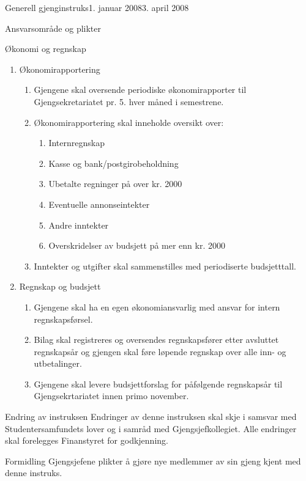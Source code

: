 \begin{instruks}{Generell gjenginstruks}{1. januar 2008}{3. april 2008}
\begin{instruksledd}{Ansvarsområde og plikter}
    \end{instruksledd}

	\begin{instruksledd}{Økonomi og regnskap}
		\begin{enumerate}
			\item Økonomirapportering
			\begin{enumerate}  
				\item Gjengene skal oversende periodiske økonomirapporter til
				Gjengsekretariatet pr. 5. hver måned i semestrene.
				\item Økonomirapportering skal inneholde oversikt over:
				\begin {enumerate} 
					\item Internregnskap
					\item Kasse og bank/postgirobeholdning
					\item Ubetalte regninger på over kr. 2000
					\item Eventuelle annonseintekter
					\item Andre inntekter
					\item Overskridelser av budsjett på mer enn kr. 2000
				\end {enumerate}
				\item Inntekter og utgifter skal sammenstilles med periodiserte 
				budsjetttall.
			\end {enumerate}
			\item {Regnskap og budsjett}
			\begin {enumerate}
				\item Gjengene skal ha en egen økonomiansvarlig med ansvar for intern 
				regnskapsførsel.
				\item Bilag skal registreres og oversendes regnskapsfører etter avsluttet 
				regnskapsår og gjengen skal føre løpende regnskap over alle inn- og 
				utbetalinger.
				\item Gjengene skal levere budsjettforslag for påfølgende regnskapsår til 
				Gjengsekrtariatet innen primo november.
			\end {enumerate}
		\end{enumerate}

	\end{instruksledd}

	\begin{instruksledd}{Endring av instruksen}
		Endringer av denne instruksen skal skje i samsvar med Studentersamfundets lover og i samråd 
		med Gjengsjefkollegiet. Alle endringer skal forelegges Finanstyret for godkjenning.

	\end{instruksledd}

	\begin{instruksledd}{Formidling}
		Gjengsjefene plikter å gjøre nye medlemmer av sin gjeng kjent med denne instruks.

	\end{instruksledd}
 	
\end{instruks}



